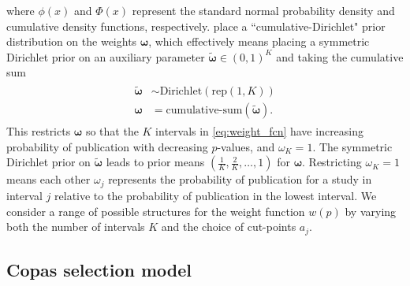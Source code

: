 \documentclass[12pt]{article}   	%
\numberwithin{equation}{section}
\begin{document}
where $\phi(x)$ and $\Phi(x)$ represent the standard normal probability density and cumulative density functions, respectively. \citet{maier2020robma} place a ``cumulative-Dirichlet" prior distribution on the weights $\boldsymbol{\omega}$, which effectively means placing a symmetric Dirichlet prior on an auxiliary parameter $\widetilde{\boldsymbol{\omega}} \in (0, 1)^K$ and taking the cumulative sum 
\begin{align}
\begin{split}
\widetilde{\boldsymbol{\omega}} & \sim \text{Dirichlet}(\text{rep}(1, K))  \\
\boldsymbol{\omega} &= \text{cumulative-sum}(\widetilde{\boldsymbol{\omega}}). 
\end{split}
\end{align}
This restricts $\boldsymbol{\omega}$ so that the $K$ intervals in \eqref{eq:weight_fcn} have increasing probability of publication with decreasing $p$-values, and $\omega_K = 1$. The symmetric Dirichlet prior on $\widetilde{\boldsymbol{\omega}}$ leads to prior means $(\frac{1}{K}, \frac{2}{K}, \dots, 1)$ for $\boldsymbol{\omega}$. Restricting $\omega_K = 1$ means each other $\omega_j$ represents the probability of publication for a study in interval $j$ relative to the probability of publication in the lowest interval. We consider a range of possible structures for the weight function $w(p)$ by varying both the number of intervals $K$ and the choice of cut-points $a_j$.


\subsection{Copas selection model} \label{sec:copas}
\end{document}
